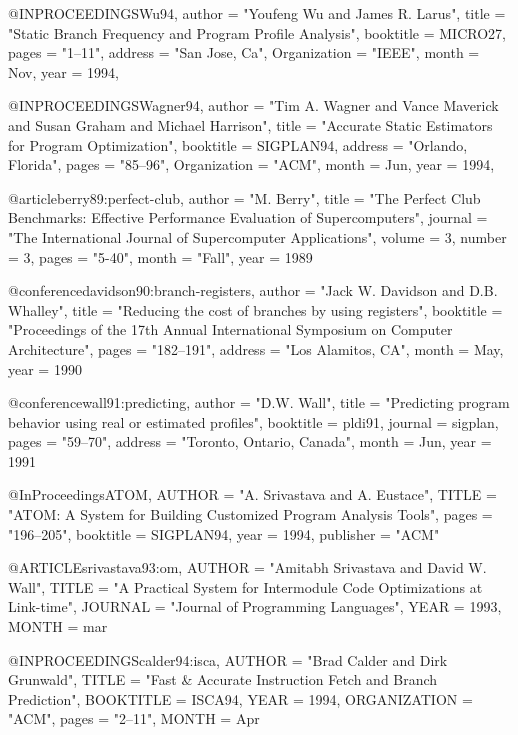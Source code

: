 @INPROCEEDINGS{Wu94,
           author = "Youfeng Wu and James R. Larus",
           title = "Static Branch Frequency and Program Profile Analysis",
	   booktitle = MICRO27,
	   pages = "1--11",
	   address = "San Jose, Ca",
 	   Organization = "IEEE",
           month = Nov,
	   year = 1994,
}



@INPROCEEDINGS{Wagner94,
           author = "Tim A. Wagner and Vance Maverick and Susan Graham and Michael Harrison",
           title = "Accurate Static Estimators for Program Optimization",
	   booktitle = SIGPLAN94,
	   address = "Orlando, Florida",
	   pages = "85--96",
 	   Organization = "ACM",
           month = Jun,
	   year = 1994,
}

@article{berry89:perfect-club,
	author		= "M. Berry",
	title		= "{T}he {P}erfect {C}lub {B}enchmarks:
			   Effective Performance Evaluation of
			   Supercomputers",
	journal		= "The International Journal of
			   Supercomputer Applications",
	volume		= 3,
	number		= 3,
	pages		= "5-40",
	month		= "Fall",
	year		= 1989
}

@conference{davidson90:branch-registers,
	author		= "Jack W. Davidson and D.B. Whalley",
	title		= "Reducing the cost of branches by using registers",
	booktitle	= "Proceedings of the 17th Annual International Symposium on Computer Architecture",
	pages		= "182--191",
	address		= "Los Alamitos, CA",
	month		= May,
	year		= 1990}

@conference{wall91:predicting,
	author		= "D.W. Wall",
	title		= "Predicting program behavior using real or estimated profiles",
	booktitle	= pldi91,
	journal		= sigplan,
	pages		= "59--70",
	address		= "Toronto, Ontario, Canada",
	month		= Jun,
	year		= 1991
}

@InProceedings{ATOM,
	AUTHOR = "A. Srivastava and A. Eustace",
	TITLE = "{ATOM}: A System for Building Customized Program Analysis Tools",
        pages = 	 "196--205",
        booktitle = SIGPLAN94,
        year = 	 1994,
        publisher = "ACM"
}

@ARTICLE{srivastava93:om,
	AUTHOR = "Amitabh Srivastava and David W. Wall",
	TITLE = "A Practical System for Intermodule Code Optimizations at Link-time",
	JOURNAL = "Journal of Programming Languages",
	YEAR = 1993,
	MONTH = mar
}


@INPROCEEDINGS{calder94:isca,
        AUTHOR = "Brad Calder and Dirk Grunwald",
        TITLE = "Fast \& Accurate Instruction Fetch and Branch Prediction",
        BOOKTITLE = ISCA94,
        YEAR = 1994,
        ORGANIZATION = "ACM",
        pages = "2--11",
        MONTH = Apr
}

